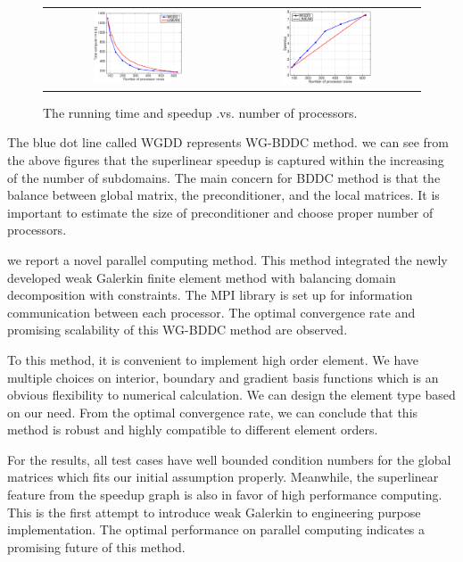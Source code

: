 				\begin{figure}[h]
					\centering
					\begin{tabular}{cc}
						\includegraphics[width=0.5\textwidth]{./pics/p1time.eps} & \includegraphics[width=0.5\textwidth]{./pics/p1speed.eps}
					\end{tabular}
					\caption{\footnotesize The running time and speedup .vs. number of processors.}\label{fig6: time}
				\end{figure}
				
				
				The blue dot line called WGDD represents WG-BDDC method. we can see from the above figures that the superlinear speedup is captured within the increasing of the number of subdomains. The main concern for BDDC method is that the balance between global matrix, the preconditioner, and the local matrices. It is important to estimate the size of preconditioner and choose proper number of processors.
				
				
	we report a novel parallel computing method. This method integrated the newly developed weak Galerkin finite element method with balancing domain decomposition with constraints. The MPI library is set up for information communication between each processor. The optimal convergence rate and promising scalability of this WG-BDDC method are observed.
	
	To this method, it is convenient to implement high order element. We have multiple choices on interior, boundary and gradient basis functions which is an obvious flexibility to numerical calculation. We can design the element type based on our need. From the optimal convergence rate, we can conclude that this method is robust and highly compatible to different element orders.
	
	For the results, all test cases have well bounded condition numbers for the global matrices which fits our initial assumption properly. Meanwhile, the superlinear feature from the speedup graph is also in favor of high performance computing. This is the first attempt to introduce weak Galerkin to engineering purpose implementation. The optimal performance on parallel computing indicates a promising future of this method.